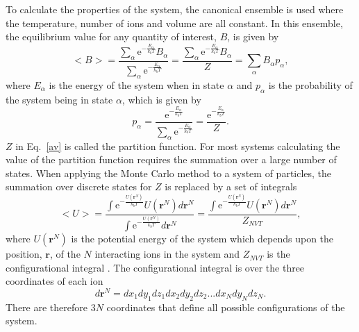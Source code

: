 \documentclass[11pt, twoside]{report}
\begin{document}
To calculate the properties of the system, the canonical ensemble is used where the temperature, number of ions and volume are all constant. In this ensemble, the equilibrium value for any quantity of interest, $B$, is given by
\begin{equation}\label{av}
<B> = \frac{ \sum_\alpha \mathrm{e}^{-\frac{E_\alpha}{k_bT}} B_\alpha}{ \sum_\alpha \mathrm{e}^{-\frac{E_\alpha}{k_bT}}} = \frac{ \sum_\alpha \mathrm{e}^{-\frac{E_\alpha}{k_bT}} B_\alpha}{Z} = \sum_\alpha B_\alpha p_\alpha,
\end{equation}
where $E_\alpha$ is the energy of the system when in state $\alpha$ and $p_\alpha$ is the probability of the system being in state $\alpha$, which is given by
\begin{equation}\label{prob}
p_\alpha = \frac{  \mathrm{e}^{-\frac{E_\alpha}{k_bT}} }{ \sum_{\alpha} \mathrm{e}^{-\frac{E_\alpha}{k_bT}}} =\frac{  \mathrm{e}^{-\frac{E_\alpha}{k_bT}} }{Z}.
\end{equation}
$Z$ in Eq.~\ref{av} is called the partition function. For most systems calculating the value of the partition function requires the summation over a large number of states. When applying the Monte Carlo method to a system of particles, the summation over discrete states for $Z$ is replaced by a set of integrals
\begin{equation}\label{MC_av}
<U> = \frac{ \int \mathrm{e}^{-\frac{U(\boldsymbol{r}^N)}{k_bT}} U(\boldsymbol{r}^N) d\boldsymbol{r}^N}{\int \mathrm{e}^{-\frac{U(\boldsymbol{r}^N)}{k_bT}} d\boldsymbol{r}^N}  = \frac{  \int \mathrm{e}^{-\frac{U(\boldsymbol{r}^N)}{k_bT}} U(\boldsymbol{r}^N) d\boldsymbol{r}^N}{Z_{NVT}} ,
\end{equation}
where $U(\mathbf{r}^N)$ is the potential energy of the system which depends upon the position, $\boldsymbol{r}$, of the $N$ interacting ions in the system and $Z_{NVT}$ is the configurational integral \cite{Lesar3}.
The configurational integral is over the three coordinates of each ion
\begin{equation}d \boldsymbol{r}^N = dx_1 dy_1 dz_1 dx_2 dy_2 dz_2... dx_N dy_N dz_N.\end{equation}\label{dr}
There are therefore $3N$ coordinates that define all possible configurations of the system.
\end{document}
